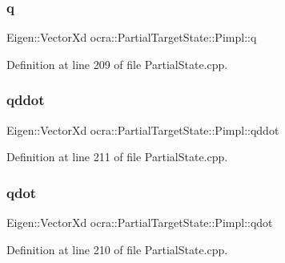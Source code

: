 \subsubsection{\texorpdfstring{q}{q}}
{\footnotesize\ttfamily Eigen\+::\+Vector\+Xd ocra\+::\+Partial\+Target\+State\+::\+Pimpl\+::q}



Definition at line 209 of file Partial\+State.\+cpp.

\hypertarget{structocra_1_1PartialTargetState_1_1Pimpl_ae9c10dd0f603be49ec43fdf69f8d6556}{}\label{structocra_1_1PartialTargetState_1_1Pimpl_ae9c10dd0f603be49ec43fdf69f8d6556} 
\subsubsection{\texorpdfstring{qddot}{qddot}}
{\footnotesize\ttfamily Eigen\+::\+Vector\+Xd ocra\+::\+Partial\+Target\+State\+::\+Pimpl\+::qddot}



Definition at line 211 of file Partial\+State.\+cpp.

\hypertarget{structocra_1_1PartialTargetState_1_1Pimpl_a788a4c8818c07f7cd401d3a7cf1cf5c4}{}\label{structocra_1_1PartialTargetState_1_1Pimpl_a788a4c8818c07f7cd401d3a7cf1cf5c4} 
\subsubsection{\texorpdfstring{qdot}{qdot}}
{\footnotesize\ttfamily Eigen\+::\+Vector\+Xd ocra\+::\+Partial\+Target\+State\+::\+Pimpl\+::qdot}



Definition at line 210 of file Partial\+State.\+cpp.

\hypertarget{structocra_1_1PartialTargetState_1_1Pimpl_a68194144a3fdbdb73744178332101ed0}{}\label{structocra_1_1PartialTargetState_1_1Pimpl_a68194144a3fdbdb73744178332101ed0} 

